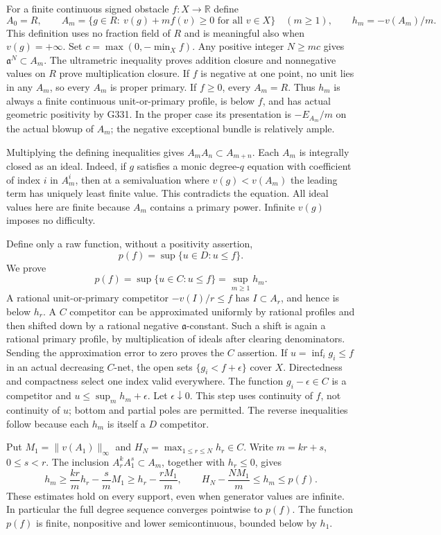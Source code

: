 \documentclass[11pt]{article}
\begin{document}
For a finite continuous signed obstacle $f:X\to\mathbb R$ define
\[
 A_0=R,\qquad A_m=\{g\in R:\ v(g)+mf(v)\ge0\text{ for all }v\in X\}\quad(m\ge1),
 \qquad h_m=-v(A_m)/m.
\]
This definition uses no fraction field of $R$ and is meaningful also when $v(g)=+\infty$. Set $c=\max(0,-\min_X f)$. Any positive integer $N\ge mc$ gives $\mathfrak a^N\subset A_m$. The ultrametric inequality proves addition closure and nonnegative values on $R$ prove multiplication closure. If $f$ is negative at one point, no unit lies in any $A_m$, so every $A_m$ is proper primary. If $f\ge0$, every $A_m=R$. Thus $h_m$ is always a finite continuous unit-or-primary profile, is below $f$, and has actual geometric positivity by G331. In the proper case its presentation is $-E_{A_m}/m$ on the actual blowup of $A_m$; the negative exceptional bundle is relatively ample.

Multiplying the defining inequalities gives $A_mA_n\subset A_{m+n}$. Each $A_m$ is integrally closed as an ideal. Indeed, if $g$ satisfies a monic degree-$q$ equation with coefficient of index $i$ in $A_m^i$, then at a semivaluation where $v(g)<v(A_m)$ the leading term has uniquely least finite value. This contradicts the equation. All ideal values here are finite because $A_m$ contains a primary power. Infinite $v(g)$ imposes no difficulty.

Define only a raw function, without a positivity assertion,
\[
 p(f)=\sup\{u\in D:u\le f\}.
\]
We prove
\[
 p(f)=\sup\{u\in C:u\le f\}=\sup_{m\ge1}h_m.
 \tag{1}
\]
A rational unit-or-primary competitor $-v(I)/r\le f$ has $I\subset A_r$, and hence is below $h_r$. A $C$ competitor can be approximated uniformly by rational profiles and then shifted down by a rational negative $\mathfrak a$-constant. Such a shift is again a rational primary profile, by multiplication of ideals after clearing denominators. Sending the approximation error to zero proves the $C$ assertion. If $u=\inf_i g_i\le f$ in an actual decreasing $C$-net, the open sets $\{g_i<f+\epsilon\}$ cover $X$. Directedness and compactness select one index valid everywhere. The function $g_i-\epsilon\in C$ is a competitor and $u\le\sup_m h_m+\epsilon$. Let $\epsilon\downarrow0$. This step uses continuity of $f$, not continuity of $u$; bottom and partial poles are permitted. The reverse inequalities follow because each $h_m$ is itself a $D$ competitor.

Put $M_1=\|v(A_1)\|_\infty$ and $H_N=\max_{1\le r\le N}h_r\in C$. Write $m=kr+s$, $0\le s<r$. The inclusion $A_r^kA_1^s\subset A_m$, together with $h_r\le0$, gives
\[
 h_m\ge \frac{kr}{m}h_r-\frac{s}{m}M_1
 \ge h_r-\frac{rM_1}{m},\qquad
 H_N-\frac{NM_1}{m}\le h_m\le p(f).
 \tag{2}
\]
These estimates hold on every support, even when generator values are infinite. In particular the full degree sequence converges pointwise to $p(f)$. The function $p(f)$ is finite, nonpositive and lower semicontinuous, bounded below by $h_1$.
\end{document}
